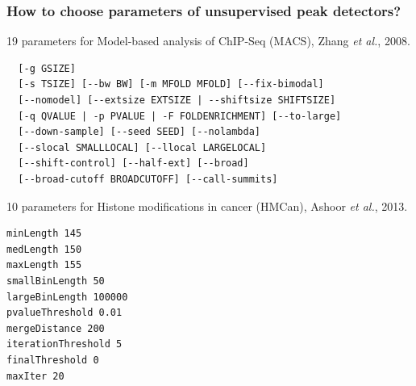 \documentclass{beamer}
\begin{document}

\begin{frame}[fragile]
  \frametitle{How to choose parameters of unsupervised peak
    detectors?}
\scriptsize
19 parameters for Model-based analysis of ChIP-Seq (MACS), Zhang {\it et al.}, 2008.
\begin{verbatim}
  [-g GSIZE]
  [-s TSIZE] [--bw BW] [-m MFOLD MFOLD] [--fix-bimodal]
  [--nomodel] [--extsize EXTSIZE | --shiftsize SHIFTSIZE]
  [-q QVALUE | -p PVALUE | -F FOLDENRICHMENT] [--to-large]
  [--down-sample] [--seed SEED] [--nolambda]
  [--slocal SMALLLOCAL] [--llocal LARGELOCAL]
  [--shift-control] [--half-ext] [--broad]
  [--broad-cutoff BROADCUTOFF] [--call-summits]
\end{verbatim}
10 parameters for Histone modifications in cancer (HMCan),
Ashoor {\it et al.}, 2013.
\begin{verbatim}
minLength 145
medLength 150
maxLength 155
smallBinLength 50
largeBinLength 100000
pvalueThreshold 0.01
mergeDistance 200
iterationThreshold 5
finalThreshold 0
maxIter 20
\end{verbatim}
\end{frame}
\end{document}
